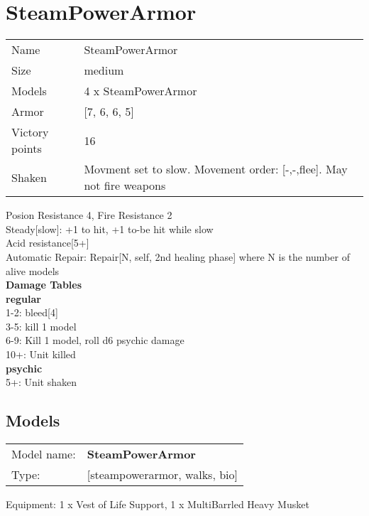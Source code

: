 \pagebreak

\section{ SteamPowerArmor }

\begin{tabular}{ll}
  Name & SteamPowerArmor \\
  Size & medium\\
  Models & 4 x SteamPowerArmor\\
  Armor & [7, 6, 6, 5]\\
  Victory points & 16\\
  Shaken & Movment set to slow. Movement order: [-,-,flee]. May not fire weapons\\
\end{tabular}

Posion Resistance 4, Fire Resistance 2\\ 
Steady[slow]: +1 to hit, +1 to-be hit while slow\\ 
Acid resistance[5+]\\ 
Automatic Repair: Repair[N, self, 2nd healing phase] where N is the number of alive models\\ 



{\bf Damage Tables} \\
 {\bf regular } \\
1-2: bleed[4] \\
3-5: kill 1 model \\
6-9: Kill 1 model, roll d6 psychic damage \\
10+: Unit killed \\
 {\bf psychic } \\
5+: Unit shaken \\


\pagebreak

\subsection{ Models }

\begin{tabular}{ll}
Model name: & {\bf SteamPowerArmor } \\
Type: & [steampowerarmor, walks, bio] \\
\end{tabular}

Equipment: 1 x Vest of Life Support, 1 x MultiBarrled Heavy Musket \\

